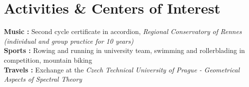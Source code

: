\section{Activities \& Centers  of Interest}
\vspace{0.1cm}

\textbf{Music :} Second cycle certificate in accordion, \textit{Regional Conservatory of Rennes (individual and group practice for 10 years)}\\

\textbf{Sports :} Rowing and running in university team, swimming and rollerblading in competition, mountain biking\\

\textbf{Travels :}
Exchange at the \textit{Czech Technical University of Prague - Geometrical Aspects of Spectral Theory}\\
